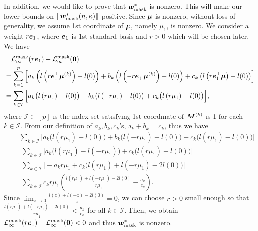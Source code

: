 In addition, we would like to prove that ${\bm{w}}_{\mathrm{mask}}^*$ is nonzero. This will make our lower bounds on $\lVert {\bm{w}}^*_\mathrm{mask}(n,\kappa) \rVert$ positive. Since ${\bm{\mu}}$ is nonzero, without loss of generality, we assume 1st coordinate of ${\bm{\mu}}$, namely $\mu_1$, is nonzero. We consider a weight $r{\bm{e}}_1$, where ${\bm{e}}_1$ is 1st standard basis and $r>0$ which will be chosen later. We have
\begin{align*}
    &\quad \mathcal{L}_\infty^\mathrm{mask}(r{\bm{e}}_1) - \mathcal{L}_\infty^\mathrm{mask}({\bm{0}})\\
    &= \sum_{k=1}^p \left[ a_k \left( l\left( r {\bm{e}}_1^\top {\bm{\mu}}^{(k)} \right) - l(0) \right) + b_k \left(  l\left( -r {\bm{e}}_1^\top {\bm{\mu}}^{(k)} \right) - l(0)\right) + c_k \left(  l\left( r {\bm{e}}_1^\top {\bm{\mu}} \right) - l(0)\right)\right]\\
    &= \sum_{k \in \mathcal{I} }\Big[ a_k \big( l\left( r \mu_1 \right) - l(0) \big) + b_k \big(  l\left( -r \mu_1 \right) - l(0)\big) + c_k \big(  l\left( r \mu_1 \right) - l(0)\big)\Big],
\end{align*}
where $\mathcal{I} \subset [p]$ is the index set satisfying 1st coordinate of ${\bm{M}}^{(k)}$ is 1 for each $k \in \mathcal{I}$. From our definition of $a_k,b_k,c_k$'s, $a_k + b_k = c_k$, thus we have
\begin{align*}
    &\quad \sum_{k \in \mathcal{I} }\Big[ a_k \big( l\left( r \mu_1 \right) - l(0) \big) + b_k \big(  l\left( -r \mu_1 \right) - l(0)\big) + c_k \big(  l\left( r \mu_1 \right) - l(0)\big)\Big]\\
    &= \sum_{k \in \mathcal{I} }\Big[ a_k \big( l\left( r \mu_1 \right) -l\left( -r \mu_1 \right) \big)  + c_k \big(  l\left( r \mu_1 \right) - l(0)\big)\Big]\\
    &= \sum_{k \in \mathcal{I} }\Big[- a_k r\mu_1  + c_k \big(  l\left( r \mu_1 \right)+l\left(- r \mu_1 \right) - 2l(0)\big)\Big]\\
    &= \sum_{k \in \mathcal{I} } c_kr\mu_1\left (  \frac{l\left( r \mu_1 \right)+l\left(- r \mu_1 \right) - 2l(0)}{r\mu_1} - \frac{a_k}{c_k}\right).
\end{align*}
Since $\lim_{z \rightarrow 0} \frac{l(z)+l(-z) - 2l(0)}{z} = 0$, we can choose $r>0$ small enough so that $\frac{l\left( r \mu_1 \right)+l\left(- r \mu_1 \right) - 2l(0)}{r\mu_1} < \frac{a_k}{c_k}$ for all $k \in \mathcal{I}$. Then, we obtain $\mathcal{L}_\infty^\mathrm{mask}(r{\bm{e}}_1) - \mathcal{L}_\infty^\mathrm{mask}({\bm{0}})<0$ and thus ${\bm{w}}_{\mathrm{mask}}^*$ is nonzero.

